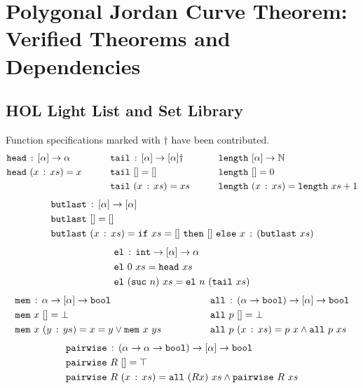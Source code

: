 \chapter{Polygonal Jordan Curve Theorem: Verified Theorems and Dependencies}
\label{app:JordanVerification}

\section{HOL Light List and Set Library}
Function specifications marked with $\dag$ have been contributed.
\begin{alignat*}{3}
  & \texttt{head}\,:\,[\alpha] \rightarrow \alpha &\qquad
  & \texttt{tail}\,:\,[\alpha] \rightarrow [\alpha]\dag &\qquad
  & \texttt{length}\ [\alpha]\rightarrow \mathbb{N}\\
  & \texttt{head}\ (x\,:\,xs) = x &\qquad
  & \texttt{tail}\ [] = [] &\qquad
  & \texttt{length}\ [] = 0\\
  & &\qquad
  &\texttt{tail}\ (x\,:\,xs) = xs &\qquad
  & \texttt{length}\ (x\,:\,xs) = \texttt{length}\ xs + 1
\end{alignat*}
\begin{align*}
  &\code{butlast}\,:\,[\alpha] \rightarrow [\alpha]\\
  &\code{butlast}\ [] = []\\
  &\code{butlast}\ (\cons{x}{xs}) = \code{if}\ xs=[]\ \code{then}\ []\ \code{else}\ \cons{x}{(\code{butlast}\ xs)}
\end{align*}
\begin{align*}
  &\texttt{el}\,:\,\texttt{int} \rightarrow [\alpha] \rightarrow \alpha\\
  &\texttt{el}\ 0\ xs = \texttt{head}\ xs\\
  &\texttt{el}\ (\texttt{suc}\ n)\ xs = \texttt{el}\ n\ (\texttt{tail}\ xs)
\end{align*}
\begin{align*}
  & \texttt{mem}\,:\,\alpha \rightarrow [\alpha] \rightarrow \texttt{bool} &\qquad\qquad
  & \texttt{all}\,:\,(\alpha\rightarrow\texttt{bool}) \rightarrow [\alpha] \rightarrow \texttt{bool}\\
  & \texttt{mem}\ x\ [] = \bot &\qquad\qquad
  & \texttt{all}\ p\ [] = \bot\\
  & \texttt{mem}\ x\ (y\,:\,ys) = x = y \vee \texttt{mem}\ x\ ys &\qquad\qquad
  & \texttt{all}\ p\ (x\,:\,xs) = p\ x \wedge \texttt{all}\ p\ xs   
\end{align*}
\begin{align*}
  & \texttt{pairwise}\,:\,(\alpha \rightarrow \alpha \rightarrow \texttt{bool}) \rightarrow [\alpha] \rightarrow \texttt{bool}\\
  & \texttt{pairwise}\ R\ [] = \top\\
  & \texttt{pairwise}\ R\ (x\,:\,xs) = \texttt{all}\ (R x)\ xs \wedge \texttt{pairwise}\ R\ xs
\end{align*}\\
